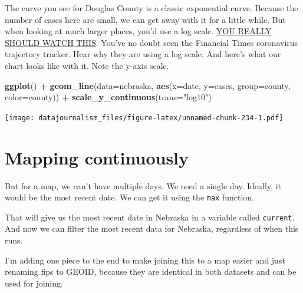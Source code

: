 \documentclass[]{book}
\newenvironment{Shaded}{\begin{snugshade}}{\end{snugshade}}
\newcommand{\DataTypeTok}[1]{\textcolor[rgb]{0.13,0.29,0.53}{#1}}
\newcommand{\KeywordTok}[1]{\textcolor[rgb]{0.13,0.29,0.53}{\textbf{#1}}}
\newcommand{\NormalTok}[1]{#1}
\newcommand{\OperatorTok}[1]{\textcolor[rgb]{0.81,0.36,0.00}{\textbf{#1}}}
\newcommand{\StringTok}[1]{\textcolor[rgb]{0.31,0.60,0.02}{#1}}
\begin{document}
The curve you see for Douglas County is a classic exponential curve. Because the number of cases here are small, we can get away with it for a little while. But when looking at much larger places, you'd use a log scale. \href{https://www.ft.com/video/9a72a9d4-8db1-4615-8333-4b73ae3ddff8}{YOU REALLY SHOULD WATCH THIS}. You've no doubt seen the Financial Times coronavirus trajectory tracker. Hear why they are using a log scale. And here's what our chart looks like with it. Note the y-axis scale.

\begin{Shaded}
\begin{Highlighting}[]
\KeywordTok{ggplot}\NormalTok{() }\OperatorTok{+}\StringTok{ }\KeywordTok{geom_line}\NormalTok{(}\DataTypeTok{data=}\NormalTok{nebraska, }\KeywordTok{aes}\NormalTok{(}\DataTypeTok{x=}\NormalTok{date, }\DataTypeTok{y=}\NormalTok{cases, }\DataTypeTok{group=}\NormalTok{county, }\DataTypeTok{color=}\NormalTok{county)) }\OperatorTok{+}\StringTok{ }\KeywordTok{scale_y_continuous}\NormalTok{(}\DataTypeTok{trans=}\StringTok{"log10"}\NormalTok{)}
\end{Highlighting}
\end{Shaded}

\texttt{[image: datajournalism\_files/figure-latex/unnamed-chunk-234-1.pdf]}

\hypertarget{mapping-continuously}{%
\section{Mapping continuously}\label{mapping-continuously}}

But for a map, we can't have multiple days. We need a single day. Ideally, it would be the most recent date. We can get it using the \texttt{max} function.

\begin{Shaded}
\end{Shaded}

That will give us the most recent date in Nebraska in a variable called \texttt{current}. And now we can filter the most recent data for Nebraska, regardless of when this runs.

I'm adding one piece to the end to make joining this to a map easier and just renaming fips to GEOID, because they are identical in both datasets and can be used for joining.
\end{document}

